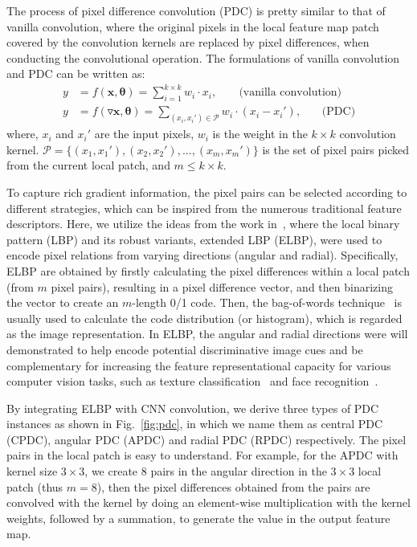 \documentclass[10pt,twocolumn,letterpaper]{article}
\begin{document}
The process of pixel difference convolution (PDC) is pretty similar to that of vanilla convolution, where the original pixels in the local feature map patch covered by the convolution kernels are replaced by pixel differences, when conducting the convolutional operation. The formulations of vanilla convolution and PDC can be written as:
\begin{align}
    y &= f(\pmb{x}, \pmb{\theta}) = \sum_{i=1}^{k\times k}w_{i}\cdot x_{i}, \;\;\;\;\;\;\; \text{(vanilla convolution)} \\
    y &= f(\triangledown\pmb{x}, \pmb{\theta}) = \sum_{(x_i, x_i')\in \pmb{\mathcal{P}}}w_{i}\cdot (x_i - x_i'), \;\;\;\;\;\;\, \text{(PDC)} \label{eq: pdc}
\end{align}
where, $x_i$ and $x_i'$ are the input pixels, $w_i$ is the weight in the $k \times k$ convolution kernel. $\pmb{\mathcal{P}} = \{(x_1, x_1'), (x_2, x_2'), ..., (x_m, x_m')\}$ is the set of pixel pairs picked from the current local patch, and $m\le k\times k$. 

To capture rich gradient information, the pixel pairs can be selected according to different strategies, which can be inspired from the numerous traditional feature descriptors. Here, we utilize the ideas from the work in~\cite{ojala2002lbp,liu2012extended,su2019bird}, where the local binary pattern (LBP) and its robust variants, extended LBP (ELBP), were used to encode pixel relations from varying directions (angular and radial). Specifically, ELBP are obtained by firstly calculating the pixel differences within a local patch (from $m$ pixel pairs), resulting in a pixel difference vector, and then binarizing the vector to create an $m$-length 0/1 code. Then, the bag-of-words technique~\cite{liu2019bow} is usually used to calculate the code distribution (or histogram), which is regarded as the image representation. In ELBP, the angular and radial directions were will demonstrated to help encode potential discriminative image cues and be complementary for increasing the feature representational capacity for various computer vision tasks, such as texture classification~\cite{liu2012extended,liu2011sorted} and face recognition~\cite{su2019bird}.

By integrating ELBP with CNN convolution, we derive three types of PDC instances as shown in Fig.~\ref{fig:pdc}, in which we name them as central PDC (CPDC), angular PDC (APDC) and radial PDC (RPDC) respectively. The pixel pairs in the local patch is easy to understand. For example, for the APDC with kernel size $3\times 3$, we create 8 pairs in the angular direction in the $3\times 3$ local patch (thus $m=8$), then the pixel differences obtained from the pairs are convolved with the kernel by doing an element-wise multiplication with the kernel weights, followed by a summation, to generate the value in the output feature map.
\end{document}
